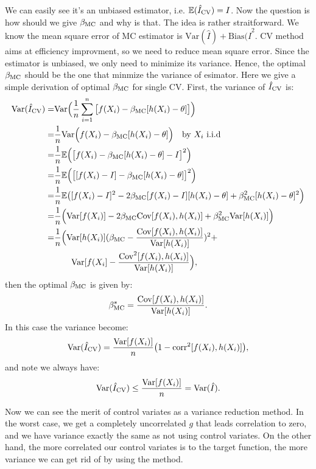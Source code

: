 We can easily see it's an unbiased estimator, i.e. $\mathbb{E}(\hat{I}_{\mathrm{CV}}) = I$.
Now the question is how should we give $\beta_{\mathrm{MC}}$ and why is that.
The idea is rather straitforward. 
We know the mean square error of MC estimator is $\mathrm{Var}(\hat{I})+\mathrm{Bias}(\hat{I}^2$\cite{}. 
CV method aims at efficiency improvment, so we need to reduce mean square error. 
Since the estimator is unbiased, we only need to minimize its variance.
Hence, the optimal $\beta_{\mathrm{MC}}$ should be the one that minmize the variance of esimator.
Here we give a simple derivation of optimal $\beta_{\mathrm{MC}}$ for single CV.
First, the variance of $\hat{I}_{\mathrm{CV}}$ is: 
\begin{align*}
	\mathrm{Var}(\hat{I}_{\mathrm{CV}})
    =&\mathrm{Var}\Big( \frac{1}{n}\sum_{i=1}^{n}\big[ f(X_i)-\beta_{\mathrm{MC}}[h(X_i)-\theta] \big]\Big)\\
    =&\frac{1}{n}\mathrm{Var}\Big(f(X_i)-\beta_{\mathrm{MC}}[h(X_i)-\theta]\Big)\quad \text{by $X_i$ i.i.d} \\
    =&\frac{1}{n}\mathbb{E}\Big(\big[f(X_i)-\beta_{\mathrm{MC}}[h(X_i)-\theta]-I\big]^2 \Big) \\
    =&\frac{1}{n}\mathbb{E}\Big(\big[ [f(X_i)-I] -\beta_{\mathrm{MC}}[h(X_i)-\theta]\big]^2 \Big) \\
    =&\frac{1}{n}\mathbb{E}\big([f(X_i)-I]^2-2\beta_{\mathrm{MC}}[f(X_i)-I][h(X_i)-\theta]+\beta_{\mathrm{MC}}^2[h(X_i)-\theta]^2 \Big)\\
    =&\frac{1}{n}\Big(\mathrm{Var}[f(X_i)]-2\beta_{\mathrm{MC}}\mathrm{Cov}[f(X_i),h(X_i)]+\beta_{\mathrm{MC}}^2\mathrm{Var}[h(X_i)]\Big)\\
    =&\frac{1}{n}\Big(\mathrm{Var}[h(X_i)](\beta_{\mathrm{MC}}-\frac{\mathrm{Cov}[f(X_i),h(X_i)]}{\mathrm{Var}[h(X_i)]})^2+\\
    &\quad \quad \mathrm{Var}[f(X_i]-\frac{\mathrm{Cov}^2[f(X_i),h(X_i)]}{\mathrm{Var}[h(X_i)]} \Big),
\end{align*}
then the optimal $\beta_{\mathrm{MC}}$ is given by: 
\begin{equation}
    \beta_{\mathrm{MC}}^*=\frac{\mathrm{Cov}[f(X_i),h(X_i)]}{\mathrm{Var}[h(X_i)]}.
    \label{eq:optBeta}
\end{equation}
In this case the variance become:
\[
    \mathrm{Var}(\hat{I}_{\mathrm{CV}})= \frac{\mathrm{Var}[f(X_i)]}{n}\big(1-\mathrm{corr}^2[f(X_i), h(X_i)]\big),
\]
and note we always have: 
\[
\mathrm{Var}(\hat{I}_{\mathrm{CV}}) \leq \frac{\mathrm{Var}[f(X_i)]}{n}=\mathrm{Var}(\hat{I}).
\]

Now we can see the merit of control variates as a variance reduction method. 
In the worst case, we get a completely uncorrelated $g$ that leads correlation to zero, and we have variance exactly the same as not using control variates. On the other hand, the more correlated our control variates is to the target function, the more variance we can get rid of by using the method.

